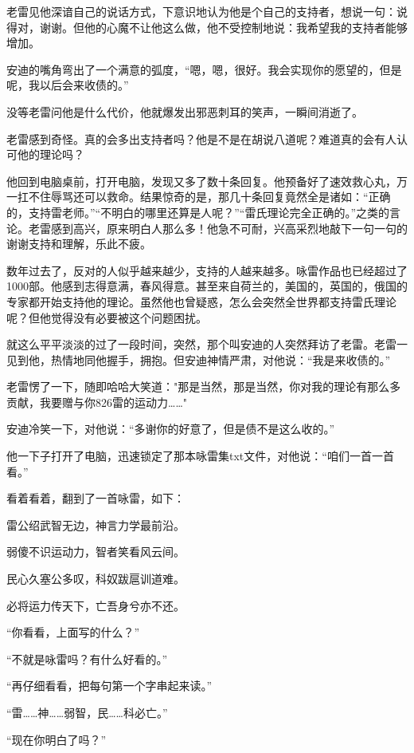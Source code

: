 \documentclass[UTF8,12pt,oneside]{ctexbook}
\begin{document}
老雷见他深谙自己的说话方式，下意识地认为他是个自己的支持者，想说一句：说得对，谢谢。但他的心魔不让他这么做，他不受控制地说：我希望我的支持者能够增加。

安迪的嘴角弯出了一个满意的弧度，“嗯，嗯，很好。我会实现你的愿望的，但是呢，我以后会来收债的。”

没等老雷问他是什么代价，他就爆发出邪恶刺耳的笑声，一瞬间消逝了。

老雷感到奇怪。真的会多出支持者吗？他是不是在胡说八道呢？难道真的会有人认可他的理论吗？

他回到电脑桌前，打开电脑，发现又多了数十条回复。他预备好了速效救心丸，万一扛不住辱骂还可以救命。结果惊奇的是，那几十条回复竟然全是诸如：“正确的，支持雷老师。”“不明白的哪里还算是人呢？”“雷氏理论完全正确的。”之类的言论。老雷感到高兴，原来明白人那么多！他急不可耐，兴高采烈地敲下一句一句的谢谢支持和理解，乐此不疲。

数年过去了，反对的人似乎越来越少，支持的人越来越多。咏雷作品也已经超过了1000部。他感到志得意满，春风得意。甚至来自荷兰的，美国的，英国的，俄国的专家都开始支持他的理论。虽然他也曾疑惑，怎么会突然全世界都支持雷氏理论呢？但他觉得没有必要被这个问题困扰。

就这么平平淡淡的过了一段时间，突然，那个叫安迪的人突然拜访了老雷。老雷一见到他，热情地同他握手，拥抱。但安迪神情严肃，对他说：“我是来收债的。”

老雷愣了一下，随即哈哈大笑道："那是当然，那是当然，你对我的理论有那么多贡献，我要赠与你826雷的运动力……"

安迪冷笑一下，对他说：“多谢你的好意了，但是债不是这么收的。”

他一下子打开了电脑，迅速锁定了那本咏雷集txt文件，对他说：“咱们一首一首看。”

看着看着，翻到了一首咏雷，如下：

\kaishu
\begin{center}
    雷公绍武智无边，神言力学最前沿。
    
    弱傻不识运动力，智者笑看风云间。
    
    民心久塞公多叹，科奴跋扈训道难。
    
    必将运力传天下，亡吾身兮亦不还。
\end{center}

\songti
“你看看，上面写的什么？”

“不就是咏雷吗？有什么好看的。”

“再仔细看看，把每句第一个字串起来读。”

“雷……神……弱智，民……科必亡。”

“现在你明白了吗？”
\end{document}
